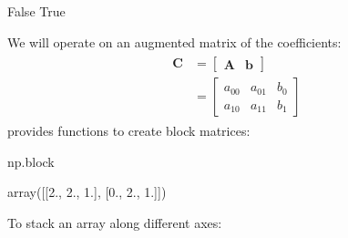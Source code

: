 \documentclass[letterpaper,10pt,english]{sphinxmanual}
\begin{document}
\begin{sphinxVerbatim}[commandchars=\\\{\}]
False
True
\end{sphinxVerbatim}


We will operate on an augmented matrix of the coefficients:
\begin{equation*}
\begin{split} \begin{aligned} \mathbf{C} &= \begin{bmatrix}
\mathbf{A} & \mathbf{b}
\end{bmatrix}\\
&= \begin{bmatrix}
a_{00} & a_{01} & b_0 \\
a_{10} & a_{11} & b_1
\end{bmatrix} 
\end{aligned}
\end{split}
\end{equation*}
 provides functions to create block matrices:

\begin{sphinxVerbatim}[commandchars=\\\{\}]
np.block
  \PYG{p}{[}\PYG{p}{]}  
\end{sphinxVerbatim}

\begin{sphinxVerbatim}[commandchars=\\\{\}]
array([[2., 2., 1.],
       [0., 2., 1.]])
\end{sphinxVerbatim}

To stack an array along different axes:
\end{document}
